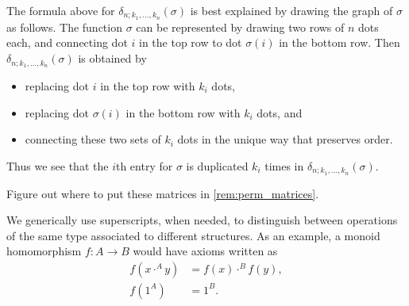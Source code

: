 \begin{rem}\label{rem:delta-s}
The formula above for $\delta_{n; k_1, \ldots, k_n}(\sigma)$ is best explained by drawing the graph of $\sigma$ as follows. The function $\sigma$ can be represented by drawing two rows of $n$ dots each, and connecting dot $i$ in the top row to dot $\sigma(i)$ in the bottom row. Then $\delta_{n; k_1, \ldots, k_n}(\sigma)$ is obtained by 
\begin{itemize}
\item replacing dot $i$ in the top row with $k_i$ dots,
\item replacing dot $\sigma(i)$ in the bottom row with $k_i$ dots, and
\item connecting these two sets of $k_i$ dots in the unique way that preserves order.
\end{itemize}
Thus we see that the $i$th entry for $\sigma$ is duplicated $k_i$ times in $\delta_{n; k_1, \ldots, k_n}(\sigma)$.
\end{rem}

\begin{rem}\label{rem:forward-matrices}
Figure out where to put these matrices in
\cref{rem:perm_matrices}.
\end{rem}

\begin{conv}[(Superscripts)]\label{conv:superscripts}
We generically use superscripts, when needed, to distinguish between operations of the same type associated to different structures. As an example, a monoid homomorphism $f \colon A \to B$ would have axioms written as
\begin{align*}
f(x \cdot^A y) & = f(x) \cdot^B f(y), \\
f(1^A) & = 1^B.
\end{align*}
\end{conv}

